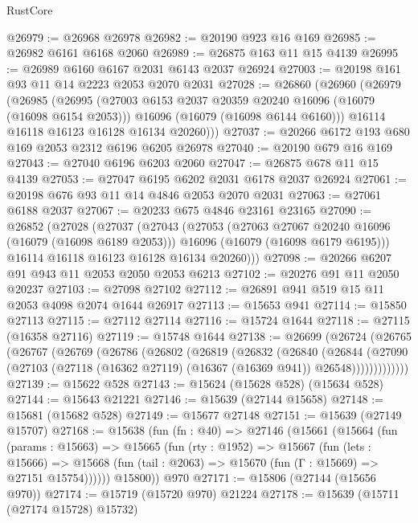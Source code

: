 \begin{lexlean}{RustCore}
\begin{coremodule}
@26979 := @26968 @26978
@26982 := @20190 @923 @16 @169
@26985 := @26982 @6161 @6168 @2060
@26989 := @26875 @163 @11 @15 @4139
@26995 := @26989 @6160 @6167 @2031 @6143 @2037 @26924
@27003 := @20198 @161 @93 @11 @14 @2223 @2053 @2070 @2031
@27028 := @26860
    (@26960
      (@26979
        (@26985
          (@26995
            (@27003 @6153 @2037 @20359 @20240 @16096 (@16079 (@16098 @6154 @2053)))
            @16096
            (@16079 (@16098 @6144 @6160)))
          @16114
          @16118
          @16123
          @16128
          @16134
          @20260)))
@27037 := @20266 @6172 @193 @680 @169 @2053 @2312 @6196 @6205 @26978
@27040 := @20190 @679 @16 @169
@27043 := @27040 @6196 @6203 @2060
@27047 := @26875 @678 @11 @15 @4139
@27053 := @27047 @6195 @6202 @2031 @6178 @2037 @26924
@27061 := @20198 @676 @93 @11 @14 @4846 @2053 @2070 @2031
@27063 := @27061 @6188 @2037
@27067 := @20233 @675 @4846 @23161 @23165
@27090 := @26852
    (@27028
      (@27037
        (@27043
          (@27053
            (@27063 @27067 @20240 @16096 (@16079 (@16098 @6189 @2053)))
            @16096
            (@16079 (@16098 @6179 @6195)))
          @16114
          @16118
          @16123
          @16128
          @16134
          @20260)))
@27098 := @20266 @6207 @91 @943 @11 @2053 @2050 @2053 @6213
@27102 := @20276 @91 @11 @2050 @20237
@27103 := @27098 @27102
@27112 := @26891 @941 @519 @15 @11 @2053 @4098 @2074 @1644 @26917
@27113 := @15653 @941
@27114 := @15850 @27113
@27115 := @27112 @27114
@27116 := @15724 @1644
@27118 := @27115 (@16358 @27116)
@27119 := @15748 @1644
@27138 := @26699
    (@26724
      (@26765
        (@26767
          (@26769
            (@26786
              (@26802
                (@26819
                  (@26832
                    (@26840
                      (@26844
                        (@27090
                          (@27103 (@27118 (@16362 @27119) (@16367 (@16369 @941)) @26548)))))))))))))
@27139 := @15622 @528
@27143 := @15624 (@15628 @528) (@15634 @528)
@27144 := @15643 @21221
@27146 := @15639 (@27144 @15658)
@27148 := @15681 (@15682 @528)
@27149 := @15677 @27148
@27151 := @15639 (@27149 @15707)
@27168 := @15638
    (fun (fn : @40) =>
    @27146
      (@15661
        (@15664
          (fun (params : @15663) =>
          @15665
            (fun (rty : @1952) =>
            @15667
              (fun (lets : @15666) =>
              @15668 (fun (tail : @2063) => @15670 (fun (Γ : @15669) => @27151 @15754))))))
        @15800))
    @970
@27171 := @15806 (@27144 (@15656 @970))
@27174 := @15719 (@15720 @970) @21224
@27178 := @15639 (@15711 (@27174 @15728) @15732)

\end{coremodule}
\end{lexlean}
